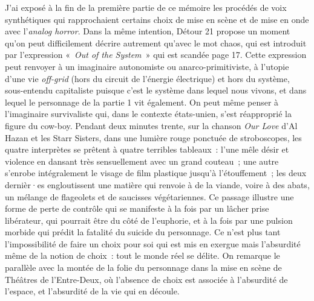 \documentclass[
]{article}
\begin{document}
J'ai exposé à la fin de la première partie de ce mémoire les procédés de voix synthétiques qui rapprochaient certains choix de mise en scène et de mise en onde avec l'\emph{analog horror}. Dans la même intention, Détour 21 propose un moment qu'on peut difficilement décrire autrement qu'avec le mot chaos, qui est introduit par l'expression «~\emph{Out of the System~}» qui est scandée page 17. Cette expression peut renvoyer à un imaginaire autonomiste ou anarco-primitiviste, à l'utopie d'une vie \emph{off-grid} (hors du circuit de l'énergie électrique) et hors du système, sous-entendu capitaliste puisque c'est le système dans lequel nous vivons, et dans lequel le personnage de la partie 1 vit également. On peut même penser à l'imaginaire survivaliste qui, dans le contexte états-unien, s'est réapproprié la figure du cow-boy. Pendant deux minutes trente, sur la chanson \emph{Our Love }d'Al Hazan et les Starr Sisters, dans une lumière rouge ponctuée de stroboscopes, les quatre interprètes se prêtent à quatre terribles tableaux~: l'une mêle désir et violence en dansant très sensuellement avec un grand couteau~; une autre s'enrobe intégralement le visage de film plastique jusqu'à l'étouffement~; les deux dernièr·es engloutissent une matière qui renvoie à de la viande, voire à des abats, un mélange de flageolets et de saucisses végétariennes. Ce passage illustre une forme de perte de contrôle qui se manifeste à la fois par un lâcher prise libérateur, qui pourrait être du côté de l'euphorie, et à la fois par une pulsion morbide qui prédit la fatalité du suicide du personnage. Ce n'est plus tant l'impossibilité de faire un choix pour soi qui est mis en exergue mais l'absurdité même de la notion de choix~: tout le monde réel se délite. On remarque le parallèle avec la montée de la folie du personnage dans la mise en scène de Théâtres de l'Entre-Deux, où l'absence de choix est associée à l'absurdité de l'espace, et l'absurdité de la vie qui en découle.
\end{document}
